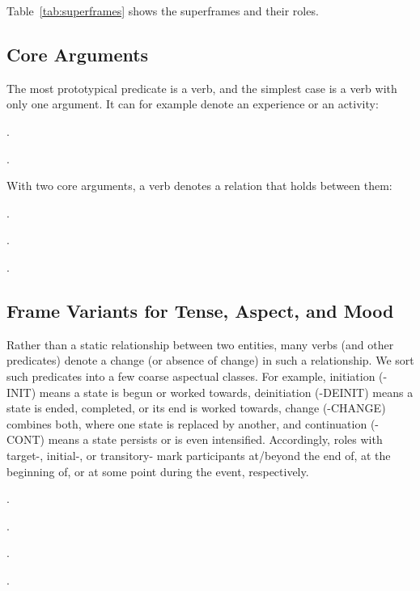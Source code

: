 \documentclass[a4paper]{article}
\newcommand{\frs}[1]{\mbox{\textsf{#1}}} %
\newcommand{\rl}[1]{\textsf{#1}}
\begin{document}
Table~\ref{tab:superframes} shows the superframes and their roles.

\subsection{Core Arguments}

The most prototypical predicate is a verb, and the simplest case is a verb with only one argument. It can for example denote an experience or an activity:

\ex.

\ex.

With two core arguments, a verb denotes a relation that holds between them:

\ex.

\ex.

\ex.

\subsection{Frame Variants for Tense, Aspect, and Mood}

Rather than a static relationship between two entities, many verbs (and other
predicates) denote a change (or absence of change) in such a relationship. We
sort such predicates into a few coarse aspectual classes. For example,
initiation (\frs{-INIT}) means a state is begun or worked towards, deinitiation
(\frs{-DEINIT}) means a state is ended, completed, or its end is worked towards,
change (\frs{-CHANGE}) combines both, where one state is replaced by another,
and continuation (\frs{-CONT}) means a state persists or is even intensified.
Accordingly, roles with \rl{target-}, \rl{initial-}, or \rl{transitory-} mark
participants at/beyond the end of, at the beginning of, or at some point during
the event, respectively.

\ex.

\ex.

\ex.

\ex.
\end{document}
